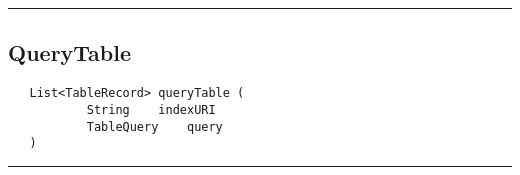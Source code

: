 \rule{15cm}{2pt}
\subsection{QueryTable}
\label{Api:QueryTable}
\begin{verbatim}
   List<TableRecord> queryTable (
           String    indexURI
           TableQuery    query
   )
\end{verbatim}



\rule{15cm}{2pt}
